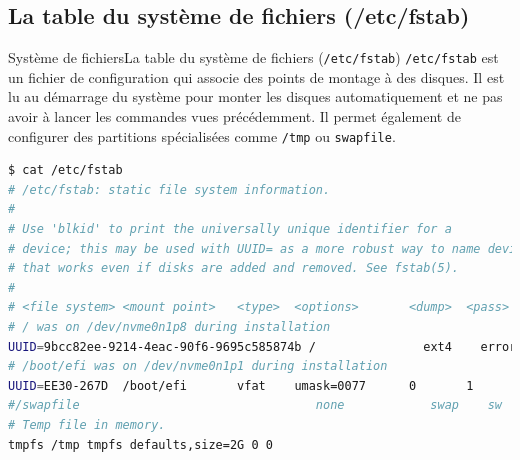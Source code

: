 \documentclass{beamer}
\begin{document}
    \subsection{La table du système de fichiers (/etc/fstab)}\label{subsec:fstab}
    \begin{frame}[fragile]{Système de fichiers}{La table du système de fichiers (\lstinline{/etc/fstab})}
        \lstinline{/etc/fstab} est un fichier de configuration qui associe des points de montage à des disques.
        Il est lu au démarrage du système pour monter les disques automatiquement et ne pas avoir à lancer les commandes vues précédemment.
        \bigbreak
        Il permet également de configurer des partitions spécialisées comme \lstinline{/tmp} ou \lstinline{swapfile}.
        \begin{lstlisting}[language=bash,basicstyle=\tiny\ttfamily]
$ cat /etc/fstab
# /etc/fstab: static file system information.
#
# Use 'blkid' to print the universally unique identifier for a
# device; this may be used with UUID= as a more robust way to name devices
# that works even if disks are added and removed. See fstab(5).
#
# <file system> <mount point>   <type>  <options>       <dump>  <pass>
# / was on /dev/nvme0n1p8 during installation
UUID=9bcc82ee-9214-4eac-90f6-9695c585874b /               ext4    errors=remount-ro 0       1
# /boot/efi was on /dev/nvme0n1p1 during installation
UUID=EE30-267D  /boot/efi       vfat    umask=0077      0       1
#/swapfile                                 none            swap    sw              0       0
# Temp file in memory.
tmpfs /tmp tmpfs defaults,size=2G 0 0
        \end{lstlisting}
    \end{frame}
\end{document}
